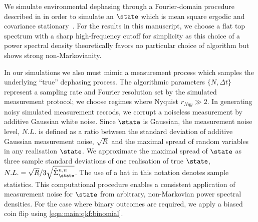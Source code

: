 

We simulate environmental dephasing through a Fourier-domain procedure described in \cite{soare2014} in order to simulate an $\state$ which is mean square ergodic and covariance stationary~\cite{gelb1974applied}.  For the results in this manuscript, we choose a flat top spectrum with a sharp high-frequency cutoff for simplicity as this choice of a power spectral density theoretically favors no particular choice of algorithm but shows strong non-Markovianity. 

In our simulations we also must mimic a measurement process which samples the underlying ``true'' dephasing process.  The algorithmic parameters $\{N, \Delta t\} $ represent a sampling rate and Fourier resolution set by the simulated measurement protocol; we choose regimes where Nyquist $r_{Nqy} \gg 2$. In generating noisy simulated measurement recrods, we corrupt a noiseless measurement by additive Gaussian white noise. Since $\state$ is Gaussian, the measurement noise level, $N.L.$ is defined as a ratio between the standard deviation of additive Gaussian measurement noise, $\sqrt{R}$ and the maximal spread of random variables in any realisation $\state$. We approximate the maximal spread of $\state$ as three sample standard deviations of one realisation of true $\state$, $N.L. = \sqrt{R}/3\sqrt{\hat{\Sigma}_\state^{n,n}}$. The use of a hat in this notation denotes sample statistics. This computational procedure enables a consistent application of measurement noise for $\state$ from arbitrary, non-Markovian power spectral densities. For the case where binary outcomes are required, we apply a biased coin flip using \cref{eqn:main:qkf:binomial}.

